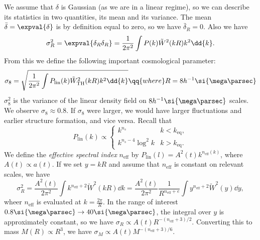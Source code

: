 \documentclass{jknotes}
\begin{document}
We assume that \(\delta\) is Gaussian (as we are in a linear regime), so we can describe its statistics in two quantities, its mean and its variance. The mean \(\bar{\delta}=\expval{\delta}\) is by definition equal to zero, so we have \(\bar\delta_R = 0\). Also we have
\begin{equation}
    \sigma_R^2 = \expval{\delta_R\delta_R} = \frac1{2\pi^2}\int P(k)\tilde{W}^2(kR)k^2\dd{k}.
\end{equation}
From this we define the following important cosmological parameter:
\begin{equation}
    \sigma_8 = \sqrt{\frac1{2\pi^2} \int P_{\text{lin}}(k)\tilde{W}_{\text{TH}}^2(kR) k^2\dd{k}} \qq{where} R=8h^{-1}\si{\mega\parsec}
\end{equation}
\(\sigma_8^2\) is the variance of the linear density field on \(8h^{-1}\si{\mega\parsec}\) scales. We observe \(\sigma_8\approx0.8\). If \(\sigma_8\) were larger, we would have larger fluctuations and earlier structure formation, and vice versa. Recall that
\begin{equation}
    P_{\text{lin}}(k) \propto
    \begin{cases}
        k^{n_s} & k < k_{\text{eq}}, \\
        k^{n_s-4}\log^2k & k > k_{\text{eq}}.
    \end{cases}
\end{equation}
We define the \emph{effective spectral index} \(n_{\text{eff}}\) by \(P_{\text{lin}}(l) = A^2(t)k^{n_{\text{eff}}(k)}\), where \(A(t) \propto a(t)\). If we set \(y=kR\) and assume that \(n_{\text{eff}}\) is constant on relevant scales, we have
\begin{equation}
    \sigma_R^2 = \frac{A^2(t)}{2\pi^2} \int k^{n_{\text{eff}}+2} \tilde{W}^2(kR)\dd{k} = \frac{A^2(t)}{2\pi^2} \frac{1}{R^{n_{\text{eff}}+e}} \int y^{n_\text{eff}+2} \tilde{W}^2(y)\dd{y},
\end{equation}
wheer \(n_{\text{eff}}\) is evaluated at \(k=\frac{2\pi}{R}\). In the range of interest \(0.8\si{\mega\parsec}\to40\si{\mega\parsec}\), the integral over \(y\) is approximately constant, so we have \(\sigma_R \propto A(t) R^{-(n_{\text{eff}}+3)/2}\). Converting this to mass \(M(R) \propto R^3\), we have \(\sigma_M \propto A(t) M^{-(n_{\text{eff}}+3)/6}\).
\end{document}

